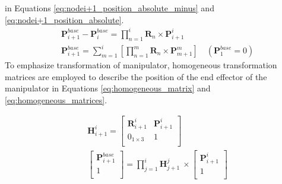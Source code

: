 in Equations \ref{eq:nodei+1_position_absolute_minus} and \ref{eq:nodei+1_position_absolute}.
\begin{align}
    &\textbf{P}_{i+1}^{base} - \textbf{P}_{i}^{base} = \prod_{n=1}^{i}\textbf{R}_{n}\times \textbf{P}_{i+1}^{i} 
    \label{eq:nodei+1_position_absolute_minus} \\
    &\textbf{P}_{i+1}^{base} = \sum_{m=1}^{i}\left[\prod_{n=1}^{m}\textbf{R}_{n}\times \textbf{P}_{m+1}^{m}\right] \quad(\textbf{P}_{1}^{base} = 0)
    \label{eq:nodei+1_position_absolute}
\end{align}
To emphasize transformation of manipulator, homogeneous transformation matrices \cite{homogeneous} are 
employed to describe the position of the end effector of the manipulator in Equations \ref{eq:homogeneous_matrix} 
and \ref{eq:homogeneous_matrices}.

\begin{align}
    &\textbf{H}_{i+1}^{i} = 
    \begin{bmatrix}
        \textbf{R}_{i+1}^{i} &  \textbf{P}_{i+1}^{i}\\
        0_{1\times3} & 1 \\
    \end{bmatrix} 
    \label{eq:homogeneous_matrix} \\
    &\begin{bmatrix}
        \textbf{P}_{i+1}^{base} \\
        1 \\
    \end{bmatrix}
    = \prod_{j=1}^{i}\textbf{H}_{j+1}^{j} \ 
    \times
    \begin{bmatrix}
        \textbf{P}_{i+1}^{i} \\
        1 \\
    \end{bmatrix} 
    \label{eq:homogeneous_matrices}
\end{align}

